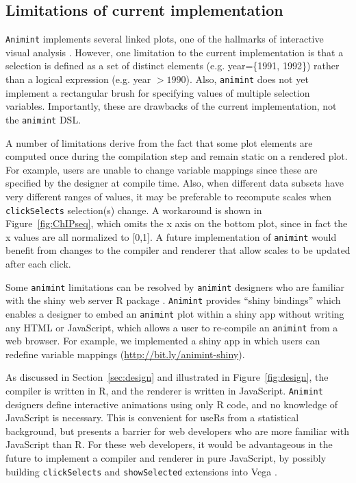 \documentclass[journal]{vgtc}\usepackage[]{graphicx}\usepackage[]{color}
\begin{document}
\subsection{Limitations of current implementation}

\texttt{Animint} implements several linked plots, one of the hallmarks of
interactive visual analysis \citep{iva}. However, one limitation to
the current implementation is that a selection is defined as a set of
distinct elements (e.g. year=\{1991, 1992\}) rather than a logical
expression (e.g. year $>1990$). Also, \texttt{animint} does not yet
implement a rectangular brush for specifying values of
multiple selection variables.
Importantly, these are drawbacks of the
current implementation, not the \texttt{animint} DSL.

A number of limitations derive from the fact that some plot elements
are computed once during the compilation step and remain static on a
rendered plot. For example, users are unable to change variable
mappings since these are specified by the designer at compile
time. Also, when different data subsets have very different ranges of
values, it may be preferable to recompute scales when
\texttt{clickSelects} selection(s) change. A workaround is shown in
Figure~\ref{fig:ChIPseq}, which omits the x axis on the bottom plot,
since in fact the x values are all normalized to [0,1]. A future
implementation of \texttt{animint} would benefit from changes to the compiler
and renderer that allow scales to be updated after each click.

Some \texttt{animint} limitations can be resolved by \texttt{animint} designers who are
familiar with the shiny web server R package \citep{shiny}.  \texttt{Animint}
provides ``shiny bindings'' which enables a designer to embed an
\texttt{animint} plot within a shiny app without writing any HTML or
JavaScript, which allows a user to re-compile an \texttt{animint} from a web
browser. For example, we implemented a shiny app in which users can
redefine variable mappings (\url{http://bit.ly/animint-shiny}).

As discussed in Section~\ref{sec:design} and illustrated in
Figure~\ref{fig:design}, the compiler is written in R, and the
renderer is written in JavaScript.
\texttt{Animint} designers define interactive animations using only R code, and
no knowledge of JavaScript is necessary. This is convenient for useRs
from a statistical background, but presents a barrier for web
developers who are more familiar with JavaScript than R. For these web
developers, it would be advantageous in the future to implement a
compiler and renderer in pure JavaScript, by possibly building
\texttt{clickSelects} and \texttt{showSelected} extensions into Vega
\citep{vega}.
\end{document}
